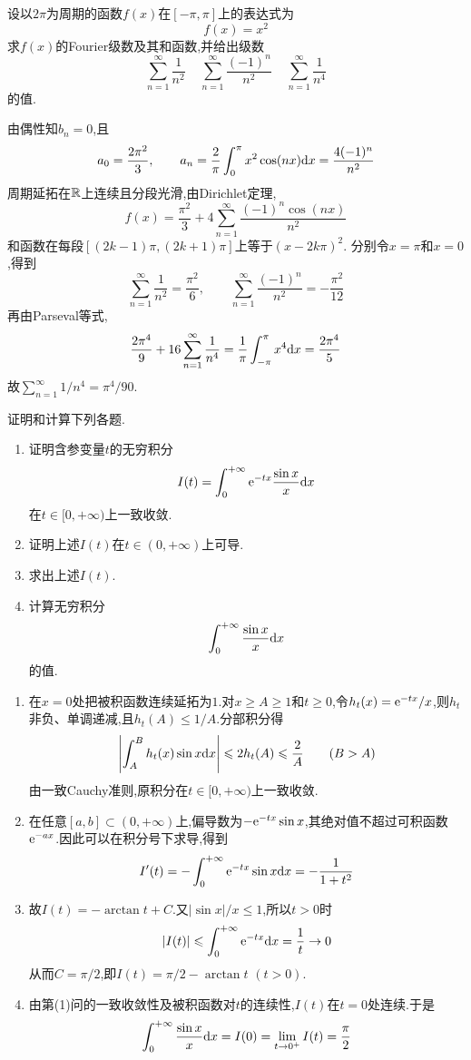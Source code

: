 \documentclass{ctexart}
\begin{document}
\begin{problem}[7.(20\songti{分})]
设以$2\pi$为周期的函数$f(x)$在$[-\pi,\pi]$上的表达式为
        \[f(x)=x^2\]
        求$f(x)$的Fourier级数及其和函数,并给出级数
        \[\sum_{n=1}^{\infty}\dfrac{1}{n^2}
        \ \ \ \ \ \sum_{n=1}^{\infty}\dfrac{(-1)^n}{n^2}
        \ \ \ \ \ \sum_{n=1}^{\infty}\dfrac{1}{n^4}\]
        的值.
\end{problem}
\begin{solution}
由偶性知$b_n=0$,且
\[a_0=\frac{2\pi^2}{3},\qquad
a_n=\frac2\pi\int_0^\pi x^2\cos(nx)\mathrm{d} x=\frac{4(-1)^n}{n^2}\]
周期延拓在$\mathbb{R}$上连续且分段光滑,由Dirichlet定理,
\[f(x)=\frac{\pi^2}{3}+4\sum_{n=1}^{\infty}\frac{(-1)^n\cos(nx)}{n^2}\]
和函数在每段$[(2k-1)\pi,(2k+1)\pi]$上等于$(x-2k\pi)^2$.
分别令$x=\pi$和$x=0$,得到
\[\sum_{n=1}^{\infty}\frac1{n^2}=\frac{\pi^2}{6},\qquad
\sum_{n=1}^{\infty}\frac{(-1)^n}{n^2}=-\frac{\pi^2}{12}\]
再由Parseval等式,
\[\frac{2\pi^4}{9}+16\sum_{n=1}^{\infty}\frac1{n^4}
=\frac1\pi\int_{-\pi}^\pi x^4\mathrm{d} x=\frac{2\pi^4}{5}\]
故$\displaystyle\sum_{n=1}^{\infty}1/n^4=\pi^4/90$.
\end{solution}

\begin{problem}[8.(10\songti{分})]
证明和计算下列各题.
        \begin{enumerate}[label=\tbf{(\arabic*)},topsep=0pt,parsep=0pt,itemsep=0pt,partopsep=0pt]
            \item 证明含参变量$t$的无穷积分
                \[I(t)=\int_0^{+\infty}\mathrm{e}^{-tx}\dfrac{\sin x}{x}\mathrm{d} x\]
                在$t\in[0,+\infty)$上一致收敛.
            \item 证明上述$I(t)$在$t\in(0,+\infty)$上可导.
            \item 求出上述$I(t)$.
            \item 计算无穷积分
                \[\int_0^{+\infty}\dfrac{\sin x}{x}\mathrm{d} x\]
                的值.
        \end{enumerate}
\end{problem}
\begin{solution}
\begin{enumerate}[label=\tbf{(\arabic*)},topsep=0pt,parsep=0pt,itemsep=0pt,partopsep=0pt]
\item 在$x=0$处把被积函数连续延拓为$1$.对$x\geqslant A\geqslant1$和$t\geqslant0$,令$h_t(x)=\mathrm{e}^{-tx}/x$,则$h_t$非负、单调递减,且$h_t(A)\leqslant1/A$.分部积分得
\[\left|\int_A^B h_t(x)\sin x\mathrm{d} x\right|\leqslant2h_t(A)\leqslant\frac2A\qquad(B>A)\]
由一致Cauchy准则,原积分在$t\in[0,+\infty)$上一致收敛.
\item 在任意$[a,b]\subset(0,+\infty)$上,偏导数为$-\mathrm{e}^{-tx}\sin x$,其绝对值不超过可积函数$\mathrm{e}^{-ax}$.因此可以在积分号下求导,得到
\[I'(t)=-\int_0^{+\infty}\mathrm{e}^{-tx}\sin x\mathrm{d} x=-\frac1{1+t^2}\]
\item 故$I(t)=-\arctan t+C$.又$|\sin x|/x\leqslant1$,所以$t>0$时
\[|I(t)|\leqslant\int_0^{+\infty}\mathrm{e}^{-tx}\mathrm{d} x=\frac1t\to0\]
从而$C=\pi/2$,即$I(t)=\pi/2-\arctan t$ $(t>0)$.
\item 由第(1)问的一致收敛性及被积函数对$t$的连续性,$I(t)$在$t=0$处连续.于是
\[\int_0^{+\infty}\frac{\sin x}{x}\mathrm{d} x=I(0)=\lim_{t\to0^+}I(t)=\frac\pi2\]
\end{enumerate}
\end{solution}
\end{document}
